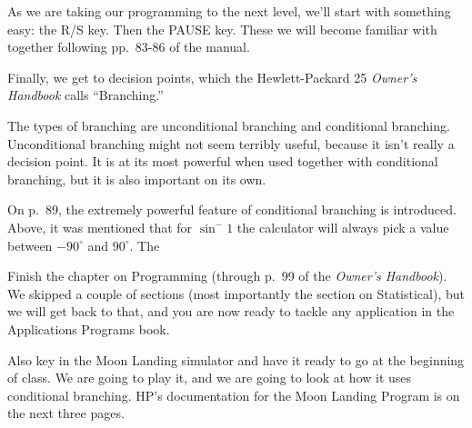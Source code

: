As we are taking our programming to the next level, we'll start with something easy: the R/S key. Then the PAUSE key. These we will become familiar with together following pp.~83-86 of the manual.

Finally, we get to decision points, which the Hewlett-Packard 25 {\it Owner's Handbook} calls ``Branching.''

\nobreak\bigskip

\noindent The types of branching are unconditional branching and conditional branching. Unconditional branching might not seem terribly useful, because it isn't really a decision point. It is at its most powerful when used together with conditional branching, but it is also important on its own.

\bigskip

\nobreak\bigskip

\noindent On p.~89, the extremely powerful feature of conditional branching is introduced. Above, it was mentioned that for $\sin^-1$ the calculator will always pick a value between $-90^{\circ}$ and $90^{\circ}$. The

\bigskip

\nobreak\bigskip

\noindent Finish the chapter on Programming (through p.~99 of the {\it Owner's Handbook}). We skipped a couple of sections (most importantly the section on Statistical), but we will get back to that, and you are now ready to tackle any application in the Applications Programs book.

Also key in the Moon Landing simulator and have it ready to go at the beginning of class. We are going to play it, and we are going to look at how it uses conditional branching. HP's documentation for the Moon Landing Program is on the next three pages.

\bye
